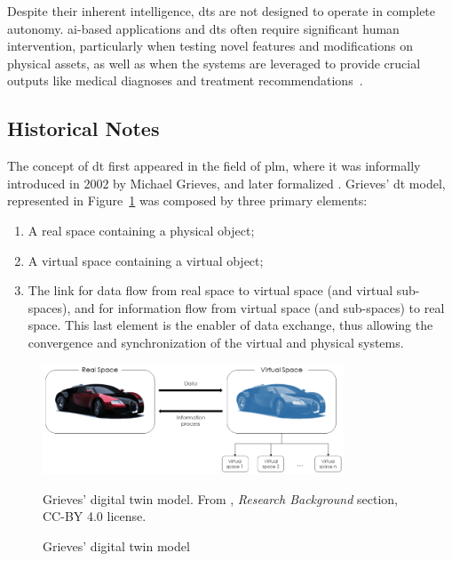 Despite their inherent intelligence, \acrshort{dt}s are not designed to operate in complete autonomy. \acrshort{ai}-based applications and \acrshort{dt}s often require significant human intervention, particularly when testing novel features and modifications on physical assets, as well as when the systems are leveraged to provide crucial outputs like medical diagnoses and treatment recommendations~\parencite{barricelliSurveyDigitalTwin2019}.

\subsection{Historical Notes}

The concept of \acrshort{dt} first appeared in the field of \acrfull{plm}, where it was informally introduced in 2002 by Michael Grieves, and later formalized \parencite{grievesDigitalTwinManufacturing2015,grievesDigitalTwinMitigating2017}. Grieves’ \acrshort{dt} model, represented in Figure~\ref{fig:grieves_digital_twin} was composed by three primary elements:
\begin{enumerate}
    \item A real space containing a physical object;
    \item A virtual space containing a virtual object;
    \item The link for data flow from real space to virtual space (and virtual sub-spaces), and for information flow from virtual space (and sub-spaces) to real space. This last element is the enabler of data exchange, thus allowing the convergence and synchronization of the virtual and physical systems.
\end{enumerate}

\begin{figure}
    \centering
    \includegraphics[width=0.8\textwidth]{images/dt_model_grieves.png}
    \caption{Grieves' digital twin model}{Grieves' digital twin model. From \cite{barricelliSurveyDigitalTwin2019}, \textit{Research Background} section, CC-BY 4.0 license.}
    \label{fig:grieves_digital_twin}
\end{figure}

